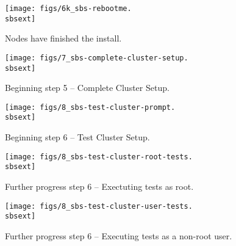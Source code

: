 \begin{figure}[htbp]
  \begin{center}
    \texttt{[image: figs/6k\_sbs-rebootme.\\sbsext]}
    \caption{Nodes have finished the install.}
    \label{fig:sbs-install-finish}
  \end{center}
\end{figure}

 

\begin{figure}[htbp]
   \begin{center}
     \texttt{[image: figs/7\_sbs-complete-cluster-setup.\\sbsext]}
     \caption{Beginning step 5 -- Complete Cluster Setup.}
     \label{fig:sbs-install-wizard-s5}
   \end{center}
 \end{figure}



 \begin{figure}[htbp]
   \begin{center}
     \texttt{[image: figs/8\_sbs-test-cluster-prompt.\\sbsext]}
     \caption{Beginning step 6 -- Test Cluster Setup.}
     \label{fig:sbs-install-wizard-s6}
   \end{center}
 \end{figure}


\begin{figure}[htbp]
  \begin{center}
    \texttt{[image: figs/8\_sbs-test-cluster-root-tests.\\sbsext]}
    \caption{Further progress step 6 -- Exectuting tests as root.}
    \label{fig:sbs-setup-test}
  \end{center}
\end{figure}

\begin{figure}[htbp]
  \begin{center}
    \texttt{[image: figs/8\_sbs-test-cluster-user-tests.\\sbsext]}
    \caption{Further progress step 6 -- Executing tests as a non-root user.}
    \label{fig:sbs-setup-test1}
  \end{center}
\end{figure}



